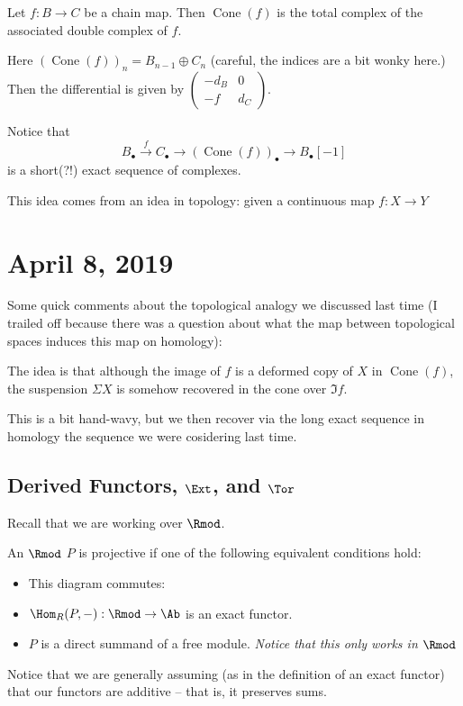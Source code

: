 \documentclass[12pt]{article}
\begin{document}
\begin{ex}
	Let $f:B\to C$ be a chain map. Then $\operatorname{Cone}(f)$ is the total complex of the associated
	double complex of $f$. 

	Here $(\operatorname{Cone}(f))_n=B_{n-1}\oplus C_n$ (careful, the indices are a bit wonky here.)
	Then the differential is given by $(\begin{smallmatrix}
		-d_B & 0\\ -f & d_C
	\end{smallmatrix})$.
\end{ex}
\begin{rmk}
	Notice that
	\[B_\bullet\xrightarrow{f} C_\bullet\to (\operatorname{Cone}(f))_\bullet\to B_\bullet[-1]\]
	is a short(?!) exact sequence of complexes.
\end{rmk}
\begin{rmk}
	This idea comes from an idea in topology: given a continuous map $f:X\to Y$
\end{rmk}

\section*{April 8, 2019}
Some quick comments about the topological analogy we discussed last time (I trailed off because
there was a question about what the map between topological spaces induces this map on homology):

The idea is that although the image of $f$ is a deformed copy of $X$ in $\operatorname{Cone}(f)$, 
the suspension $\Sigma X$ is somehow recovered in the cone over $\Im f$.

This is a bit hand-wavy, but we then recover via the long exact sequence in homology the sequence
we were cosidering last time.

\subsection*{Derived Functors, $\Ext$, and $\Tor$}
Recall that we are working over $\Rmod$.
\begin{defn}
	An $\Rmod$ $P$ is projective if one of the following equivalent conditions hold:
	\begin{itemize}
		\item This diagram commutes:
		\begin{center}\end{center}
		\item $\Hom_R(P,-):\Rmod\to\Ab$ is an exact functor.
		\item $P$ is a direct summand of a free module. \textit{Notice that this only works in $\Rmod$}
	\end{itemize}
\end{defn}
\begin{rmk}
	Notice that we are generally assuming (as in the definition of an exact functor) that our
	functors are additive -- that is, it preserves sums. 
\end{rmk}
\end{document}
